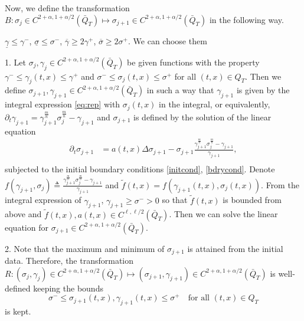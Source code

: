 \documentclass[a4paper,11pt]{article}
\theoremstyle{remark}
\begin{document}
Now, we define the transformation $B:\sigma_j\in C^{2+\alpha,1+\alpha/2}(\bar{Q}_T) \mapsto \sigma_{j+1}\in C^{2+\alpha,1+\alpha/2}(\bar{Q}_T)$ in the following way.

$\underline\gamma \le \gamma^-$, $\underline\sigma \le \sigma^-$, $\overline\gamma \ge 2\gamma^+$, $\overline\sigma \ge 2\sigma^+$. We can choose them 



1. Let $\sigma_{j},\gamma_{j}\in C^{2+\alpha,1+\alpha/2}(\bar{Q}_T)$ be given functions with the property $\gamma^- \le \gamma_j(t,x) \le \gamma^+$ and $\sigma^- \le \sigma_j(t,x) \le \sigma^+$ for all $(t,x)\in Q_T$. Then we define $\sigma_{j+1},\gamma_{j+1}\in C^{2+\alpha,1+\alpha/2}(\bar{Q}_T)$ in such a way that 
$\gamma_{j+1}$ is given by the integral expression \eqref{eq:rep} with $\sigma_{j}(t,x)$ in the integral, or equivalently,  $\partial_t\gamma_{j+1} = \gamma_{j+1}^{\frac{m}{n}}\sigma_j^{\frac{m}{n}} - \gamma_{j+1}$ and $\sigma_{j+1}$ is defined by the solution of the linear equation
 \begin{equation}\label{aux2}
 \begin{aligned}
 \partial_t \sigma_{j+1} &= a(t,x) \Delta \sigma_{j+1} -\sigma_{j+1}\frac{\gamma_{j+1}^{\frac{m}{n}}\sigma_j^{\frac{m}{n}} - \gamma_{j+1}}{\gamma_{j+1}}, \\
 \end{aligned}
 \end{equation}
 subjected to the initial boundary conditions \eqref{initcond}, \eqref{bdrycond}. Denote $f(\gamma_{j+1},\sigma_j)\triangleq\frac{\gamma_{j+1}^{\frac{m}{n}}\sigma_j^{\frac{m}{n}} - \gamma_{j+1}}{\gamma_{j+1}}$ and $\tilde{f}(t,x) = f(\gamma_{j+1}(t,x),\sigma_j(t,x))$. From the integral expression of $\gamma_{j+1}$, $\gamma_{j+1}\ge \sigma^- >0$ so that $\tilde{f}(t,x)$ is bounded from above and $\tilde f (t,x), a(t,x)\in C^{\ell,\ell/2}(\bar{Q}_T)$. Then we can solve the linear equation for $\sigma_{j+1}\in C^{2+\alpha,1+\alpha/2}(\bar{Q}_T)$. 
 
 2. Note that the maximum and minimum of $\sigma_{j+1}$ is attained from the initial data. Therefore, the transformation $R:(\sigma_{j},\gamma_{j})\in C^{2+\alpha,1+\alpha/2}(\bar{Q}_T) \mapsto (\sigma_{j+1},\gamma_{j+1})\in C^{2+\alpha,1+\alpha/2}(\bar{Q}_T)$ is well-defined keeping the bounds
 $$ \sigma^-\le \sigma_{j+1}(t,x),\gamma_{j+1}(t,x) \le \sigma^+\quad \text{for all $(t,x)\in Q_T$}$$
 is kept.
 
\end{document}
